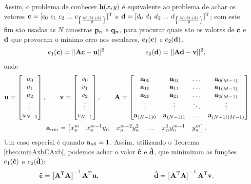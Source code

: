 \begin{theorem}
Assim, o problema de conhecer $\VECTOR{h}(x,y)$ é equivalente ao 
problema de achar os vetores 
$\VECTOR{c}=[c_0~c_1~c_2~...~c_{\left\{ \frac{M(M+3)}{2}\right\}} ]^{\transpose}$ e
$\VECTOR{d}=[d_0~d_1~d_2~...~d_{\left\{ \frac{M(M+3)}{2}\right\}} ]^{\transpose}$;
com este fim são usadas as $N$ amostras $\VECTOR{p}_n$ e $\VECTOR{q}_n$,
para  procurar quais são os valores de $\VECTOR{c}$ e $\VECTOR{d}$
que provocam o mínimo erro nos escalares, 
$e_1(\VECTOR{c})$  e $e_2(\VECTOR{d})$.%
\begin{equation}\label{eq:mapeamento:3}
 e_1(\VECTOR{c})=||\MATRIX{A}\VECTOR{c}-\VECTOR{u}||^2 \qquad\qquad\qquad  e_2(\VECTOR{d})=||\MATRIX{A}\VECTOR{d}-\VECTOR{v}||^2,
\end{equation}
onde 
\begin{equation}\label{eq:mapeamento:4}
\VECTOR{u}=
\begin{bmatrix}
u_0 \\
u_1 \\
u_2 \\
\vdots \\
u_{N-1}
\end{bmatrix},
\qquad
\VECTOR{v}=
\begin{bmatrix}
v_0 \\
v_1 \\
v_2 \\
\vdots \\
v_{N-1}
\end{bmatrix},
\qquad
\MATRIX{A}=
\begin{bmatrix}
\VECTOR{a}_{00}     & \VECTOR{a}_{01}     & \dots  & \VECTOR{a}_{0(M-1)} \\
\VECTOR{a}_{10}     & \VECTOR{a}_{11}     & \dots  & \VECTOR{a}_{1(M-1)} \\
\VECTOR{a}_{20}     & \VECTOR{a}_{21}     & \dots  & \VECTOR{a}_{2(M-1)} \\
\vdots              & \vdots              & \ddots & \vdots \\
\VECTOR{a}_{(N-1)0} & \VECTOR{a}_{(N-1)1} & \dots  & \VECTOR{a}_{(N-1)(M-1)}
\end{bmatrix}
\end{equation}
\begin{equation}\label{eq:mapeamento:5}
\VECTOR{a}_{nm}=
\begin{bmatrix}
x^m_n  & x^{m-1}_n y_n  & x^{m-2}_n y^2_n    & \dots  & x^{1}_n y^{m-1}_n &  y^m_n 
\end{bmatrix}.
\end{equation}
Um caso especial é quando $\VECTOR{a}_{n0}=1$.
Assim, utilizando o Teorema \ref{theo:minAxbCAxb},
podemos achar o valor $\VECTOR{\hat{c}}$ e $\VECTOR{\hat{d}}$,
que minimizam as funções  $e_1(\VECTOR{\hat{c}})$  e $e_2(\VECTOR{\hat{d}})$:
\begin{equation}\label{eq:mapeamento:6}
\VECTOR{\hat{c}}=
\left[ \MATRIX{A}^{\transpose}  \MATRIX{A} \right]^{-1}\MATRIX{A}^{\transpose} \VECTOR{u},
\qquad \qquad \qquad \qquad
\VECTOR{\hat{d}}=
\left[ \MATRIX{A}^{\transpose}  \MATRIX{A} \right]^{-1}\MATRIX{A}^{\transpose} \VECTOR{v}.
\end{equation}


\end{theorem}

